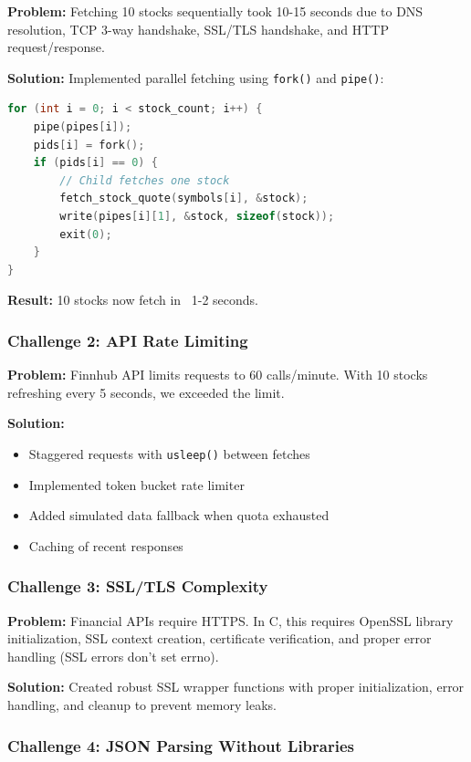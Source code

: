 \documentclass[12pt,a4paper]{article}
\begin{document}
\textbf{Problem:} Fetching 10 stocks sequentially took 10-15 seconds due to DNS resolution, TCP 3-way handshake, SSL/TLS handshake, and HTTP request/response.

\textbf{Solution:} Implemented parallel fetching using \texttt{fork()} and \texttt{pipe()}:

\begin{lstlisting}[language=C]
for (int i = 0; i < stock_count; i++) {
    pipe(pipes[i]);
    pids[i] = fork();
    if (pids[i] == 0) {
        // Child fetches one stock
        fetch_stock_quote(symbols[i], &stock);
        write(pipes[i][1], &stock, sizeof(stock));
        exit(0);
    }
}
\end{lstlisting}

\textbf{Result:} 10 stocks now fetch in ~1-2 seconds.

\subsubsection{Challenge 2: API Rate Limiting}

\textbf{Problem:} Finnhub API limits requests to 60 calls/minute. With 10 stocks refreshing every 5 seconds, we exceeded the limit.

\textbf{Solution:}
\begin{itemize}[itemsep=0.3em]
    \item Staggered requests with \texttt{usleep()} between fetches
    \item Implemented token bucket rate limiter
    \item Added simulated data fallback when quota exhausted
    \item Caching of recent responses
\end{itemize}

\subsubsection{Challenge 3: SSL/TLS Complexity}

\textbf{Problem:} Financial APIs require HTTPS. In C, this requires OpenSSL library initialization, SSL context creation, certificate verification, and proper error handling (SSL errors don't set errno).

\textbf{Solution:} Created robust SSL wrapper functions with proper initialization, error handling, and cleanup to prevent memory leaks.

\subsubsection{Challenge 4: JSON Parsing Without Libraries}
\end{document}
